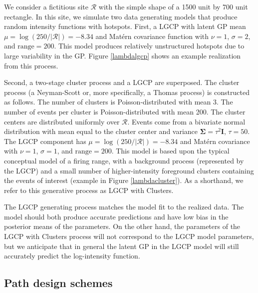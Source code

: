 \documentclass[review]{elsarticle}
\begin{document}
We consider a fictitious site \(\mathcal{R}\) with the simple shape of a 1500
unit by 700 unit rectangle. In this site, we simulate two data generating
models that produce random intensity functions with hotspots. First, a LGCP
with latent GP mean \(\mu = \log(250 / |\mathcal{R}|) = -8.34\) and
Mat\'{e}rn covariance function with \(\nu = 1\), \(\sigma = 2\), and
\(\text{range} = 200\). This model produces relatively unstructured hotspots
due to large variability in the GP. Figure \ref{lambdalgcp} shows an example
realization from this process.

Second, a two-stage cluster process and a LGCP are superposed. The cluster
process (a Neyman-Scott or, more specifically, a Thomas process) is constructed
as follows. The number of clusters is Poisson-distributed with mean 3. The
number of events per cluster is Poisson-distributed with mean 200. The cluster
centers are distributed uniformly over \(\mathcal{R}\). Events come from a
bivariate normal distribution with mean equal to the cluster center and
variance \(\boldsymbol{\Sigma} = \tau^{2}\mathbf{I}\), \(\tau = 50\). The LGCP
component has \(\mu = \log(250 / |\mathcal{R}|) = -8.34\) and Mat\'{e}rn
covariance with \(\nu = 1\), \(\sigma = 1\), and \(\text{range} = 200\). This
model is based upon the typical conceptual model of a firing range, with a
background process (represented by the LGCP) and a small number of
higher-intensity foreground clusters containing the events of interest
(example in Figure \ref{lambdacluster}). As a shorthand, we refer to this
generative process as LGCP with Clusters.

The LGCP generating process matches the model fit to the realized data. The
model should both produce accurate predictions and have low bias in the
posterior means of the parameters. On the other hand, the parameters of the
LGCP with Clusters process will not correspond to the LGCP model parameters,
but we anticipate that in general the latent GP in the LGCP model will still
accurately predict the log-intensity function.


\subsection{Path design schemes}
\end{document}
